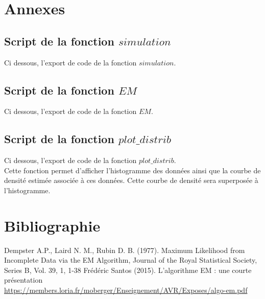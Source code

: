 \documentclass[a4paper,french,10pt]{article}
\begin{document}
\newpage


\section{Annexes}
\subsection{Script de la fonction $simulation$}
Ci dessous, l'export de code de la fonction $simulation$.


\newpage

\subsection{Script de la fonction $EM$}
Ci dessous, l'export de code de la fonction $EM$.


\newpage

\subsection{Script de la fonction $plot\_distrib$}
Ci dessous, l'export de code de la fonction $plot\_distrib$. \\
Cette fonction permet d'afficher l'histogramme des données ainsi que la courbe de densité estimée associée à ces données. Cette courbe de densité sera superposée à l'histogramme.


\newpage

\section{Bibliographie}

\renewcommand\refname{}
\begin{thebibliography}{9}
	Dempster A.P., Laird N. M., Rubin D. B. (1977). Maximum Likelihood from Incomplete Data via the EM Algorithm, Journal of the Royal Statistical Society, Series B, Vol. 39, 1, 1-38
	Frédéric Santos (2015). L'algorithme EM : une courte présentation
	\url{https://members.loria.fr/moberger/Enseignement/AVR/Exposes/algo-em.pdf}
\end{thebibliography}
\end{document}
